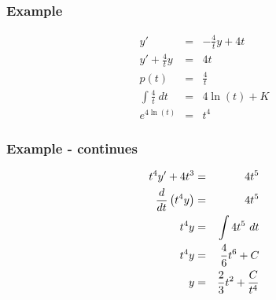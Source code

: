 \begin{frame}
  \frametitle{Example}

  \begin{eqnarray*}
    y' & = & -\frac{4}{t} y + 4 t \\
    y' + \frac{4}{t} y & = & 4 t \\
    p(t) & = & \frac{4}{t} \\
    \int \frac{4}{t} ~ dt & = & 4 \ln(t) + K \\
    e^{4 \ln(t) } & = & t^4
  \end{eqnarray*}

\end{frame}

\begin{frame}
  \frametitle{Example - continues}

  \begin{eqnarray*}
    t^4 y' + 4t^3& = & 4 t^5 \\
    \frac{d}{dt} \left( t^4 y \right) & = & 4 t^5 \\
    t^4 y & = & \int 4 t^5 ~ dt \\
    t^4 y & = & \frac{4}{6} t^6 + C \\
    y & = & \frac{2}{3} t^2 + \frac{C}{t^4}
  \end{eqnarray*}

\end{frame}



